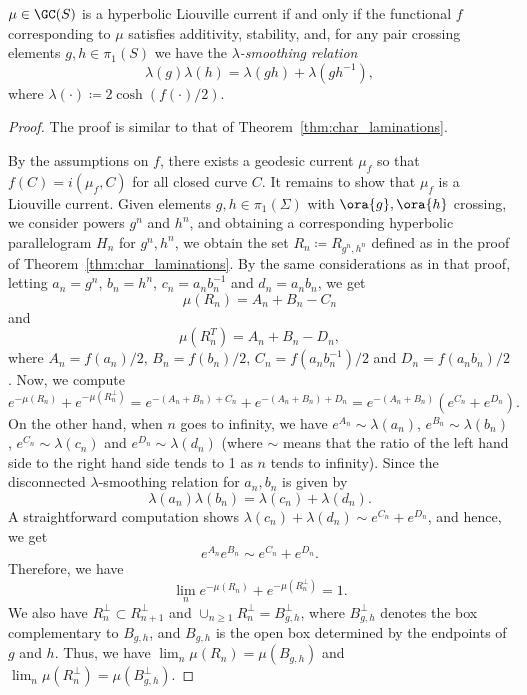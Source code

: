 \begin{theorem}
$\mu \in \GC(S)$ is a hyperbolic Liouville current if and only if the functional $f$ corresponding to $\mu$ satisfies additivity, stability, and,
    for any pair crossing elements $g, h \in \pi_1(S)$ we have the \emph{$\lambda$-smoothing relation}  \[
        \lambda \left(g\right)\lambda \left(h\right) = \lambda \left(gh\right) + \lambda \left(gh^{-1}\right),
  \]
  where $\lambda( \cdot ) \coloneqq 2\cosh(f(\cdot)/2)$.
    \label{prop:char_liouville}
  \end{theorem}
\begin{proof}
The proof is similar to that of Theorem~\ref{thm:char_laminations}.

By the assumptions on $f$, there exists a geodesic current $\mu_f$ so that $f(C)=i(\mu_f,C)$ for all closed curve $C$.
It remains to show that $\mu_f$ is a Liouville current.
Given elements $g, h \in \pi_1(\Sigma)$ with $\ora{g}, \ora{h}$ crossing, we consider powers $g^n$ and $h^n$, and obtaining a corresponding hyperbolic parallelogram $H_n$ for $g^n,h^n$, we obtain the set $R_n \coloneqq R_{g^n,h^n}$ defined as in the proof of Theorem~\ref{thm:char_laminations}.
By the same considerations as in that proof, letting $a_n=g^n$, $b_n=h^n$, $c_n=a_n b_n^{-1}$ and $d_n=a_n b_n$,
we get
\[\mu(R_n)=A_n + B_n-C_n\]
and
\[
\mu(R_n^T)=A_n + B_n -D_n,
\]
where $A_n=f(a_n)/2$, $B_n=f(b_n)/2$, $C_n=f(a_nb_n^{-1})/2$ and $D_n=f(a_nb_n)/2$.
Now, we compute
\[
e^{-\mu(R_n)} + e^{-\mu(R_n^{\perp})} = e^{-(A_n+B_n)+C_n} + e^{-(A_n+B_n)+D_n} = e^{-(A_n+B_n)} (e^{C_n} + e^{D_n}).
\]
On the other hand, when $n$ goes to infinity, we have $e^{A_n} \sim \lambda(a_n)$, $e^{B_n} \sim \lambda(b_n)$, $e^{C_n} \sim \lambda(c_n)$ and $e^{D_n} \sim \lambda(d_n)$ (where $\sim$ means that the ratio of the left hand side to the right hand side tends to 1 as $n$ tends to infinity). Since the disconnected $\lambda$-smoothing relation for $a_n, b_n$ is given by
\[
\lambda(a_n)\lambda(b_n) = \lambda(c_n) + \lambda(d_n).
\]
A straightforward computation shows $\lambda(c_n) + \lambda(d_n) \sim e^{C_n}+e^{D_n}$, and hence, we get
\[
e^{A_n}e^{B_n} \sim e^{C_n}+e^{D_n}.
\]
Therefore, we have
\[
\lim_n e^{-\mu(R_n)} + e^{-\mu(R_n^{\perp})}=1.
\]
We also have $R_n^{\perp} \subset R_{n+1}^{\perp}$ and $\cup_{n \geq 1} R_n^{\perp} = B_{g,h}^{\perp}$, where $B_{g,h}^{\perp}$ denotes the box complementary to $B_{g,h}$, and $B_{g,h}$ is the open box determined by the endpoints of $g$ and $h$.
Thus, we have $\lim_n \mu(R_n)=\mu(B_{g,h})$ and $\lim_n \mu(R_n^{\perp})=\mu(B_{g,h}^{\perp})$.

\end{proof}
